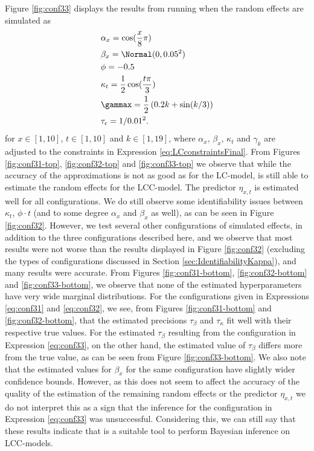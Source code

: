 Figure \ref{fig:conf33} displays the results from running \inlabru when the random effects are simulated as
\begin{equation}
    \begin{aligned}
        &\alpha_x = \cos(\frac{x}{8}\pi)\\
        &\beta_x = \Normal(0,0.05^2)\\
        &\phi = -0.5\\
        &\kappa_t = \frac{1}{2}\cos(\frac{t\pi}{3})\\
        &\gammax = \frac{1}{2}\left( 0.2k + \sin(k/3)\right)\\
        &\tau_{\epsilon} = 1/0.01^2.
    \end{aligned}
    \label{eq:conf33}
\end{equation}
for $x\in[1,10]$, $t \in [1,10]$ and $k \in [1,19]$, where $\alpha_x$, $\beta_x$, $\kappa_t$ and $\gamma_k$ are adjusted to the constraints in Expression \ref{eq:LCconstraintsFinal}. 
From Figures \ref{fig:conf31-top}, \ref{fig:conf32-top} and \ref{fig:conf33-top} we observe that while the accuracy of the approximations is not as good as for the LC-model, \inlabru is still able to estimate the random effects for the LCC-model. The predictor $\eta_{x,t}$ is estimated well for all configurations. We do still observe some identifiability issues between $\kappa_t$, $\phi \cdot t$ (and to some degree $\alpha_x$ and $\beta_x$ as well), as can be seen in Figure \ref{fig:conf32}. However, we test several other configurations of simulated effects, in addition to the three configurations described here, and we observe that most results were not worse than the results displayed in Figure \ref{fig:conf32} (excluding the types of configurations discussed in Section \ref{sec:IdentifiabilityKappa}), and many results were accurate. From Figures \ref{fig:conf31-bottom}, \ref{fig:conf32-bottom} and \ref{fig:conf33-bottom}, we observe that none of the estimated hyperparameters have very wide marginal distributions. For the configurations given in Expressions \ref{eq:conf31} and \ref{eq:conf32}, we see, from Figures \ref{fig:conf31-bottom} and \ref{fig:conf32-bottom}, that the estimated precisions $\tau_\beta$ and $\tau_\kappa$ fit well with their respective true values. For the estimated $\tau_\beta$ resulting from the configuration in Expression \ref{eq:conf33}, on the other hand, the estimated value of $\tau_\beta$ differs more from the true value, as can be seen from Figure \ref{fig:conf33-bottom}. We also note that the estimated values for $\beta_x$ for the same configuration have slightly wider confidence bounds. However, as this does not seem to affect the accuracy of the quality of the estimation of the remaining random effects or the predictor $\eta_{x,t}$ we do not interpret this as a sign that the inference for the configuration in Expression \ref{eq:conf33} was unsuccessful. Considering this, we can still say that these results indicate that \inlabru is a suitable tool to perform Bayesian inference on LCC-models. 
